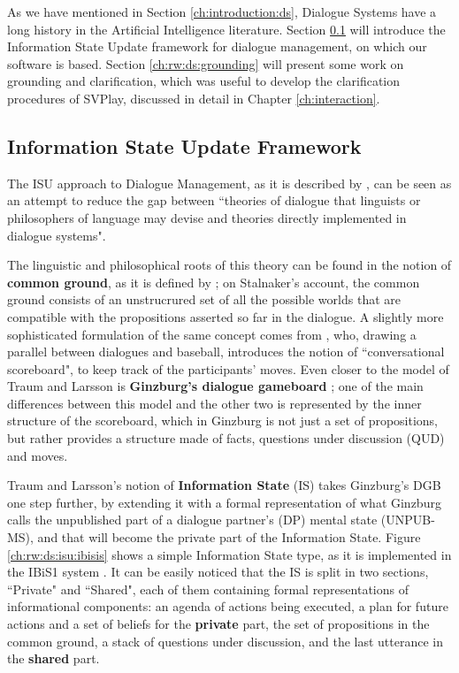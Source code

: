 As we have mentioned in Section \ref{ch:introduction:ds}, Dialogue Systems have a long history in the Artificial Intelligence literature. Section \ref{ch:rw:ds:isu} will introduce the Information State Update framework for dialogue management, on which our software is based. Section \ref{ch:rw:ds:grounding} will present some work on grounding and clarification, which was useful to develop the clarification procedures of SVPlay, discussed in detail in Chapter \ref{ch:interaction}.

\subsection{Information State Update Framework}\label{ch:rw:ds:isu}
The ISU approach to Dialogue Management, as it is described by \cite{TraumLarsson03p325}, can be seen as an attempt to reduce the gap between ``theories of dialogue that linguists or philosophers of language may devise and theories directly implemented in dialogue systems".

The linguistic and philosophical roots of this theory can be found in the notion of \textbf{common ground}, as it is defined by \cite{Stalnaker}; on Stalnaker's account, the common ground consists of an unstrucrured set of all the possible worlds that are compatible with the propositions asserted so far in the dialogue. A slightly more sophisticated formulation of the same concept comes from \cite{lewis}, who, drawing a parallel between dialogues and baseball, introduces the notion of ``conversational scoreboard", to keep track of the participants' moves. Even closer to the model of Traum and Larsson is \textbf{Ginzburg's dialogue gameboard} \citep{LLBook59315}; one of the main differences between this model and the other two is represented by the inner structure of the scoreboard, which in Ginzburg is not just a set of propositions, but rather provides a structure made of facts, questions under discussion (QUD) and moves.

Traum and Larsson's notion of \textbf{Information State} (IS) takes Ginzburg's DGB one step further, by extending it with a formal representation of what Ginzburg calls the unpublished part of a dialogue partner's (DP) mental state (UNPUB-MS), and that will become the private part of the Information State. Figure \ref{ch:rw:ds:isu:ibisis} shows a simple Information State type, as it is implemented in the IBiS1 system \citep[p. 36]{Larsson02issue-baseddialogue}. It can be easily noticed that the IS is split in two sections, ``Private" and ``Shared", each of them containing formal representations of informational components: an agenda of actions being executed, a plan for future actions and a set of beliefs for the \textbf{private} part, the set of propositions in the common ground, a stack of questions under discussion, and the last utterance in the \textbf{shared} part.

